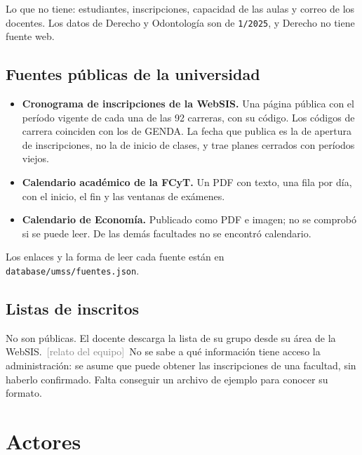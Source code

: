 \documentclass[11pt,letterpaper]{article}
\newcommand{\relatado}{\textcolor{gray}{\footnotesize\,[relato del equipo]}}
\begin{document}
Lo que no tiene: estudiantes, inscripciones, capacidad de las aulas y correo de los
docentes. Los datos de Derecho y Odontología son de \texttt{1/2025}, y Derecho no tiene
fuente web.

\subsection{Fuentes públicas de la universidad}

\begin{itemize}
  \item \textbf{Cronograma de inscripciones de la WebSIS.} Una página pública con el
        período vigente de cada una de las 92 carreras, con su código. Los códigos de
        carrera coinciden con los de GENDA. La fecha que publica es la de apertura de
        inscripciones, no la de inicio de clases, y trae planes cerrados con períodos
        viejos.
  \item \textbf{Calendario académico de la FCyT.} Un PDF con texto, una fila por día, con
        el inicio, el fin y las ventanas de exámenes.
  \item \textbf{Calendario de Economía.} Publicado como PDF e imagen; no se comprobó si
        se puede leer. De las demás facultades no se encontró calendario.
\end{itemize}

Los enlaces y la forma de leer cada fuente están en \texttt{database/umss/fuentes.json}.

\subsection{Listas de inscritos}

No son públicas. El docente descarga la lista de su grupo desde su área de la WebSIS.
\relatado\ No se sabe a qué información tiene acceso la administración: se asume que
puede obtener las inscripciones de una facultad, sin haberlo confirmado. Falta conseguir
un archivo de ejemplo para conocer su formato.

\section{Actores}
\end{document}
